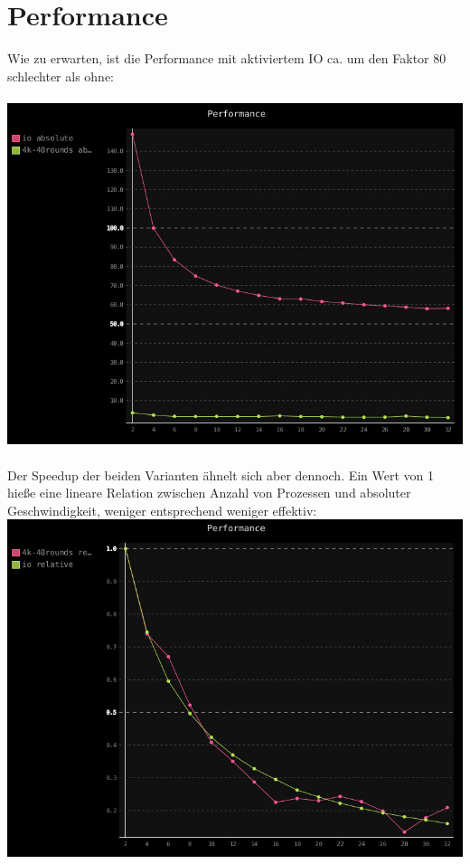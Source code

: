 \section{Performance}
Wie zu erwarten, ist die Performance mit aktiviertem IO ca. um den Faktor 80 schlechter als ohne: \\
\\
\includegraphics[scale=0.52]{pics/io-vs-no-io-abs.jpg}
\quad \\ \\
Der Speedup der beiden Varianten ähnelt sich aber dennoch. 
Ein Wert von 1 hieße eine lineare Relation zwischen Anzahl von Prozessen und absoluter Geschwindigkeit,
weniger entsprechend weniger effektiv: \\
\includegraphics[scale=0.52]{pics/io-vs-no-io-rel.jpg}
